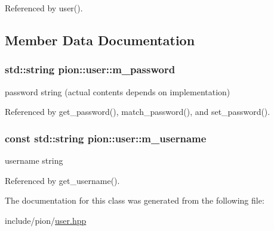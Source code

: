 Referenced by user().



\subsection{Member Data Documentation}
\hypertarget{classpion_1_1user_aebf5fb3a48c950dc906ee3bfeb414562}{
\subsubsection[{m\-\_\-password}]{\setlength{\rightskip}{0pt plus 5cm}std\-::string pion\-::user\-::m\-\_\-password\hspace{0.3cm}{\ttfamily [protected]}}}\label{classpion_1_1user_aebf5fb3a48c950dc906ee3bfeb414562}


password string (actual contents depends on implementation) 



Referenced by get\-\_\-password(), match\-\_\-password(), and set\-\_\-password().

\hypertarget{classpion_1_1user_a49689c1ffbdfa6a6d69fe445d290ddaa}{
\subsubsection[{m\-\_\-username}]{\setlength{\rightskip}{0pt plus 5cm}const std\-::string pion\-::user\-::m\-\_\-username\hspace{0.3cm}{\ttfamily [protected]}}}\label{classpion_1_1user_a49689c1ffbdfa6a6d69fe445d290ddaa}


username string 



Referenced by get\-\_\-username().



The documentation for this class was generated from the following file\-:\begin{DoxyCompactItemize}
\item 
include/pion/\hyperlink{user_8hpp}{user.\-hpp}\end{DoxyCompactItemize}
